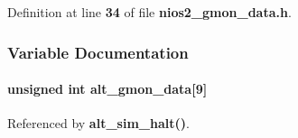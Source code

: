 Definition at line {\bf 34} of file {\bf nios2\+\_\+gmon\+\_\+data.\+h}.



\subsubsection{Variable Documentation}
\paragraph[{alt\+\_\+gmon\+\_\+data}]{\setlength{\rightskip}{0pt plus 5cm}unsigned int alt\+\_\+gmon\+\_\+data[9]}\label{nios2__gmon__data_8h_a657819c6a414a7c7ce6f5b63b514d7bf}


Referenced by {\bf alt\+\_\+sim\+\_\+halt()}.

